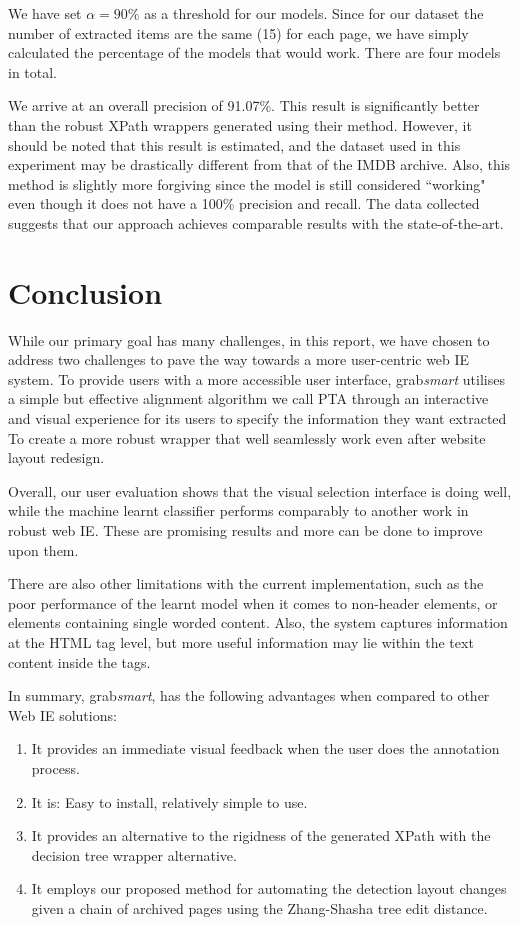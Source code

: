 \documentclass[a4paper,12pt]{nurop}
\begin{document}
We have set $\alpha = 90\%$ as a threshold for our models.
Since for our dataset the number of extracted items are the same (15) for each page,
we have simply calculated the percentage of the models that would work. There are four
models in total.

We arrive at an overall precision of 91.07\%. This result is significantly better than the robust
XPath wrappers generated using their method. However,
it should be noted that this result is estimated, and the dataset used in this experiment may
be drastically different from that of the IMDB archive. Also, this method is slightly more forgiving
since the model is still considered ``working" even though it does not have a 100\% precision
and recall. The data collected suggests that our approach achieves comparable
results with the state-of-the-art.
\section{Conclusion}
While our primary goal has many challenges, in this report, we have chosen to address 
two challenges to pave the way towards a more user-centric web IE system. To provide users with a more accessible
user interface, grab\textit{smart} utilises a simple but effective alignment algorithm we call
PTA through an interactive and visual experience for its users to specify the information they want extracted
To create a more robust wrapper that well seamlessly work even after website layout redesign.

Overall, our user evaluation shows that the visual selection interface is doing well, 
while the machine learnt classifier performs comparably to another work in robust 
web IE. These are promising results and more can be done to improve upon them.

There are also other limitations with the current implementation, such as the poor performance of
the learnt model when it comes to non-header elements, or elements containing single worded
content. Also, the system captures information at the HTML tag level, but more useful information
may lie within the text content inside the tags.

In summary, grab\textit{smart}, has the following advantages when compared to other Web IE solutions:
\begin{enumerate}
	\item It provides an immediate visual feedback when the user does the annotation process.
	\item It is: Easy to install, relatively simple to use.
	\item It provides an alternative to the rigidness of the generated XPath with the decision
	tree wrapper alternative.
	\item It employs our proposed method for automating the detection layout changes given
	a chain of archived pages using the Zhang-Shasha tree edit distance.
\end{enumerate}


\end{document}
